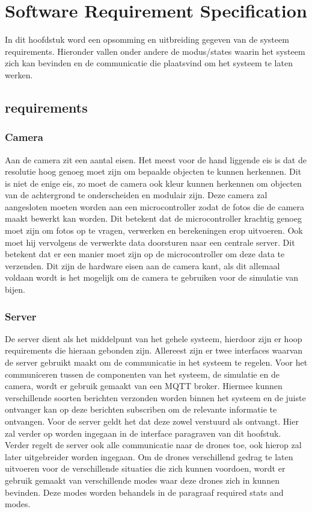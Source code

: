 \section{Software Requirement Specification}
In dit hoofdstuk word een opsomming en uitbreiding gegeven van de systeem requirements. Hieronder vallen onder andere
de modus/states waarin het systeem zich kan bevinden en de communicatie die plaatsvind om het systeem te laten werken.

\subsection{requirements}

\subsubsection*{Camera}
Aan de camera zit een aantal eisen. Het meest voor de hand liggende eis is dat de resolutie hoog genoeg moet zijn
om bepaalde objecten te kunnen herkennen. Dit is niet de enige eis, zo moet de camera ook kleur kunnen herkennen 
om objecten van de achtergrond te onderscheiden en modulair zijn. Deze camera zal aangesloten moeten worden aan 
een microcontroller zodat de fotos die de camera maakt bewerkt kan worden. Dit betekent dat de microcontroller 
krachtig genoeg moet zijn om fotos op te vragen, verwerken en berekeningen erop uitvoeren. Ook moet hij vervolgens 
de verwerkte data doorsturen naar een centrale server. Dit betekent dat er een manier moet zijn op de microcontroller 
om deze data te verzenden. Dit zijn de hardware eisen aan de camera kant, 
als dit allemaal voldaan wordt is het mogelijk om de camera te gebruiken voor de simulatie van bijen.

\subsubsection*{Server}
De server dient als het middelpunt van het gehele systeem, hierdoor zijn er hoop requirements die hieraan gebonden zijn.
Allereest zijn er twee interfaces waarvan de server gebruikt maakt om de communicatie in het systeem te regelen.
Voor het communiceren tussen de componenten van het systeem, de simulatie en de camera, wordt er gebruik gemaakt van een
MQTT broker. Hiermee kunnen verschillende soorten berichten verzonden worden binnen het systeem en de juiste ontvanger kan
op deze berichten subscriben om de relevante informatie te ontvangen. Voor de server geldt het dat deze zowel verstuurd als ontvangt.
Hier zal verder op worden ingegaan in de interface paragraven van dit hoofstuk. Verder regelt de server ook alle communicatie 
naar de drones toe, ook hierop zal later uitgebreider worden ingegaan. Om de drones verschillend gedrag te laten uitvoeren 
voor de verschillende situaties die zich kunnen voordoen, wordt er gebruik gemaakt van verschillende modes waar deze drones zich in kunnen bevinden. 
Deze modes worden behandels in de paragraaf required stats and modes.

